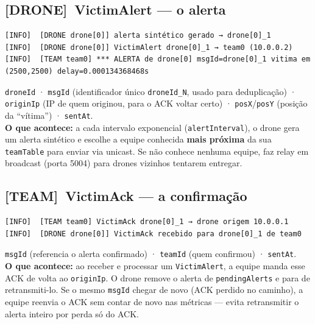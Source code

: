 \documentclass[11pt,a4paper]{article}
\newcommand{\droneTag}{\textcolor{droneblue}{\textbf{[DRONE]}}}
\newcommand{\teamTag}{\textcolor{teamgreen}{\textbf{[TEAM]}}}
\begin{document}
\subsection{\droneTag~VictimAlert --- o alerta}

\begin{lstlisting}[style=simlog]
[INFO]	[DRONE drone[0]] alerta sintético gerado → drone[0]_1
[INFO]	[DRONE drone[0]] VictimAlert drone[0]_1 → team0 (10.0.0.2)
[INFO]	[TEAM team0] *** ALERTA de drone[0] msgId=drone[0]_1 vitima em (2500,2500) delay=0.000134368468s
\end{lstlisting}

\begin{explica}
\texttt{droneId} · \texttt{msgId} (identificador único \texttt{droneId\_N},
usado para deduplicação) · \texttt{originIp} (IP de quem originou, para o ACK
voltar certo) · \texttt{posX}/\texttt{posY} (posição da ``vítima'') ·
\texttt{sentAt}. \\[2pt]
\textbf{O que acontece:} a cada intervalo exponencial (\texttt{alertInterval}),
o drone gera um alerta sintético e escolhe a equipe conhecida \textbf{mais
próxima} da sua \texttt{teamTable} para enviar via unicast. Se não conhece
nenhuma equipe, faz relay em broadcast (porta 5004) para drones vizinhos
tentarem entregar.
\end{explica}

\subsection{\teamTag~VictimAck --- a confirmação}

\begin{lstlisting}[style=simlog]
[INFO]	[TEAM team0] VictimAck drone[0]_1 → drone origem 10.0.0.1
[INFO]	[DRONE drone[0]] VictimAck recebido para drone[0]_1 de team0
\end{lstlisting}

\begin{explica}
\texttt{msgId} (referencia o alerta confirmado) · \texttt{teamId} (quem
confirmou) · \texttt{sentAt}. \\[2pt]
\textbf{O que acontece:} ao receber e processar um \texttt{VictimAlert}, a
equipe manda esse ACK de volta ao \texttt{originIp}. O drone remove o alerta
de \texttt{pendingAlerts} e para de retransmiti-lo. Se o mesmo \texttt{msgId}
chegar de novo (ACK perdido no caminho), a equipe reenvia o ACK sem contar de
novo nas métricas --- evita retransmitir o alerta inteiro por perda só do ACK.
\end{explica}
\end{document}
